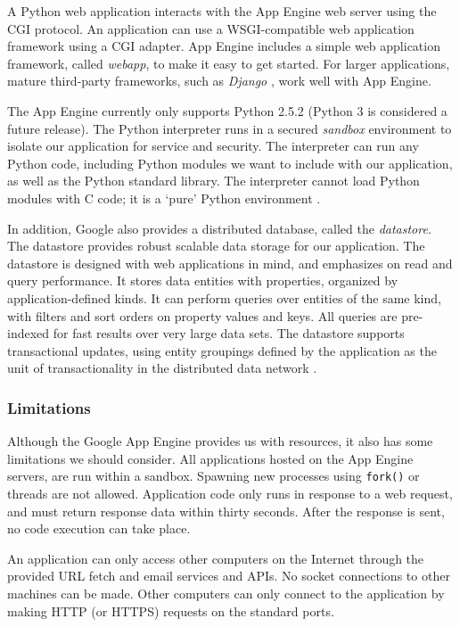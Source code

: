 A Python web application interacts with the App Engine web server using the CGI
protocol. An application can use a WSGI-compatible web application framework
using a CGI adapter. App Engine includes a simple web application framework,
called \emph{webapp}, to make it easy to get started. For larger applications,
mature third-party frameworks, such as \emph{Django} \cite{django-www}, work
well with App Engine.

The App Engine currently only supports Python 2.5.2 (Python 3 is considered a
future release). The Python interpreter runs in a secured \emph{sandbox}
environment to isolate our application for service and security. The interpreter
can run any Python code, including Python modules we want to  include with our
application, as well as the Python standard library. The interpreter cannot load
Python modules with C code; it is a `pure' Python environment
\cite{app-engine-sandbox}.

In addition, Google also provides a distributed database, called the
\emph{datastore}. The datastore provides robust scalable data storage for our
application. The datastore is designed with web applications in mind, and
emphasizes on read and query performance. It stores data entities with
properties, organized by application-defined kinds. It can perform queries over entities of
the same kind, with filters and sort orders on property values and keys. All
queries are pre-indexed for fast results over very large data sets. The datastore
supports transactional updates, using entity groupings defined by the application
as the unit of transactionality in the distributed data network
\cite{app-engine-datastore}.

\subsubsection{Limitations}
Although the Google App Engine provides us with resources, it also has some
limitations we should consider. All applications hosted on the App Engine
servers, are run within a sandbox. Spawning new processes using \texttt{fork()}
or threads are not allowed. Application code only runs in response to a web
request, and must return response data within thirty seconds. After the response
is sent, no code execution can take place.

An application can only access other computers on the Internet through the
provided URL fetch and email services and APIs. No socket connections to other
machines can be made. Other computers can only connect to the application by
making HTTP (or HTTPS) requests on the standard ports.

